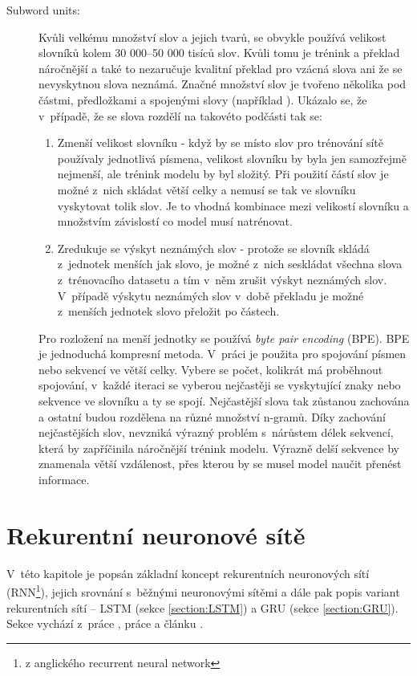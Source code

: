 \begin{description}
  \item[Subword units:]\label{subsection:subwords} Kvůli velkému množství slov a jejich tvarů, se obvykle používá velikost slovníků kolem 30 000--50 000 tisíců slov. Kvůli tomu je trénink a překlad náročnější a také to nezaručuje kvalitní překlad pro vzácná slova ani že se nevyskytnou slova neznámá. Značné množství slov je tvořeno několika pod částmi, předložkami a spojenými slovy (například ). Ukázalo se, že v~případě, že se slova rozdělí na takovéto podčásti tak se:

      \begin{enumerate}
        \item Zmenší velikost slovníku - když by se místo slov pro trénování sítě používaly jednotlivá písmena, velikost slovníku by byla jen samozřejmě nejmenší, ale trénink modelu by byl složitý. Při použití částí slov je možné z~nich skládat větší celky a nemusí se tak ve slovníku vyskytovat tolik slov. Je to vhodná kombinace mezi velikostí slovníku a množstvím závislostí co model musí natrénovat.
        \item Zredukuje se výskyt neznámých slov - protože se slovník skládá z~jednotek menších jak slovo, je možné z~nich seskládat všechna slova z~trénovacího datasetu a tím v~něm zrušit výskyt neznámých slov. V~případě výskytu neznámých slov v~době překladu je možné z~menších jednotek slovo přeložit po částech.
      \end{enumerate}

      Pro rozložení na menší jednotky se používá \emph{byte pair encoding} (BPE). BPE je jednoduchá kompresní metoda. V~práci \cite{subwords} je použita pro spojování písmen nebo sekvencí ve větší celky. Vybere se počet, kolikrát má proběhnout spojování, v~každé iteraci se vyberou nejčastěji se vyskytující znaky nebo sekvence ve slovníku a ty se spojí. Nejčastější slova tak zůstanou zachována a ostatní budou rozdělena na různé množství n-gramů. Díky zachování nejčastějších slov, nevzniká výrazný problém s~nárůstem délek sekvencí, která by zapříčinila náročnější trénink modelu. Výrazně delší sekvence by znamenala větší vzdálenost, přes kterou by se musel model naučit přenést informace.
\end{description}

\section{Rekurentní neuronové sítě}\label{section:rnn}
V~této kapitole je popsán základní koncept rekurentních neuronových sítí (RNN\footnote{z anglického recurrent neural network}), jejich srovnání s~běžnými neuronovými sítěmi a dále pak popis variant rekurentních sítí -- LSTM (sekce \ref{section:LSTM}) a GRU (sekce \ref{section:GRU}). Sekce vychází z~práce \cite{nmtThesis}, práce \cite{nmtTutorial} a článku \cite{understandingLSTM}.


